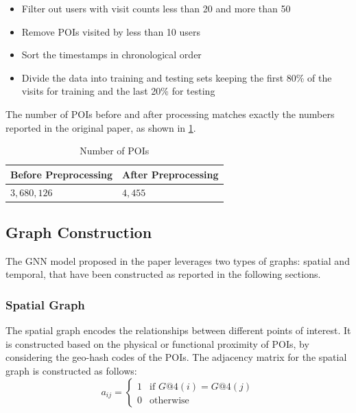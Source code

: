 \documentclass[twocolumn,twoside]{article}
\begin{document}
\begin{itemize}
  \item Filter out users with visit counts less than 20 and more than 50
  \item Remove POIs visited by less than 10 users
  \item Sort the timestamps in chronological order
  \item Divide the data into training and testing sets keeping the first 80\% of the visits for training and the last 20\% for testing
\end{itemize}
The number of POIs before and after processing matches exactly
the numbers reported in the original paper, as shown in \cref{tab:poidata}.
\begin{table}
  \caption{Number of POIs}
  \centering
  \begin{tabular}{ll}
    \toprule
    Before Preprocessing & After Preprocessing \\
    \midrule
    \midrule
    $3,680,126$          & $4,455$             \\
    \bottomrule
  \end{tabular}
  \label{tab:poidata}
\end{table}

\subsection{Graph Construction}
The GNN model proposed in the paper leverages two types 
of graphs: spatial and temporal, that have been constructed
as reported in the following sections.
\subsubsection{Spatial Graph}
The spatial graph encodes the relationships between
different points of interest. It is constructed based on the
physical or functional proximity of POIs, by considering
the geo-hash codes of the POIs. The adjacency matrix for the
spatial graph is constructed as follows:
\begin{equation}
  a_{ij} = \begin{cases}
    1 & \text{if } G@4(i) = G@4(j) \\
    0 & \text{otherwise}
  \end{cases}
\end{equation}
\end{document}
